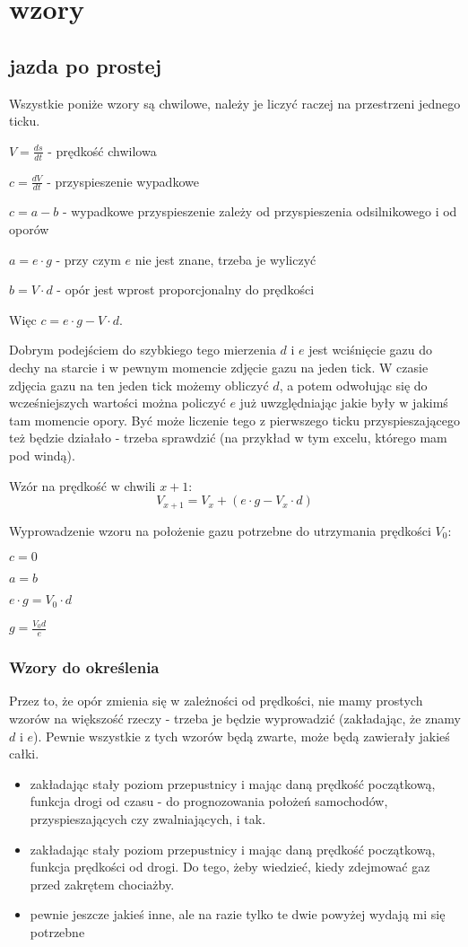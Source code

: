 \documentclass[12pt]{article}
\begin{document}
\section{wzory}
\subsection{jazda po prostej}
Wszystkie poniże wzory są chwilowe, należy je liczyć raczej na przestrzeni jednego ticku.

$V = \frac{ds}{dt}$ - prędkość chwilowa

$c = \frac{dV}{dt}$ - przyspieszenie wypadkowe

$c = a - b$ - wypadkowe przyspieszenie zależy od przyspieszenia odsilnikowego i od oporów

$a = e \cdot g$ - przy czym $e$ nie jest znane, trzeba je wyliczyć

$b = V \cdot d$ - opór jest wprost proporcjonalny do prędkości

Więc $c = e\cdot g - V\cdot d$. 

Dobrym podejściem do szybkiego tego mierzenia $d$ i $e$ jest wciśnięcie gazu do dechy na starcie i w pewnym momencie zdjęcie gazu na jeden tick. W czasie zdjęcia gazu na ten jeden tick możemy obliczyć $d$, a potem odwołując się do wcześniejszych wartości można policzyć $e$ już uwzględniając jakie były w jakimś tam momencie opory. Być może liczenie tego z pierwszego ticku przyspieszającego też będzie działało - trzeba sprawdzić (na przykład w tym excelu, którego mam pod windą).

Wzór na prędkość w chwili $x+1$: $$V_{x+1} = V_{x} + (e \cdot  g - V_x \cdot  d)$$

Wyprowadzenie wzoru na położenie gazu potrzebne do utrzymania prędkości $V_0$: 

$c=0$

$a=b$

$e \cdot  g = V_0 \cdot  d$

$g = \frac{V_0d}{e}$

\subsubsection{Wzory do określenia}
Przez to, że opór zmienia się w zależności od prędkości, nie mamy prostych wzorów na większość rzeczy - trzeba je będzie wyprowadzić (zakładając, że znamy $d$ i $e$). Pewnie wszystkie z tych wzorów będą zwarte, może będą zawierały jakieś całki.

\begin{itemize}
 \item zakładając stały poziom przepustnicy i mając daną prędkość początkową, funkcja drogi od czasu - do prognozowania położeń samochodów, przyspieszających czy zwalniających, i tak.
 \item zakładając stały poziom przepustnicy i mając daną prędkość początkową, funkcja prędkości od drogi. Do tego, żeby wiedzieć, kiedy zdejmować gaz przed zakrętem chociażby.
 \item pewnie jeszcze jakieś inne, ale na razie tylko te dwie powyżej wydają mi się potrzebne
\end{itemize}
\end{document}
